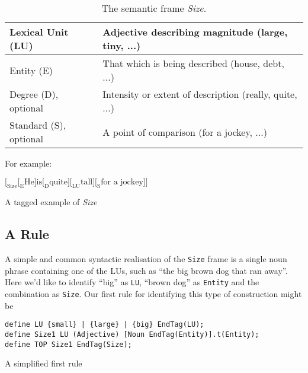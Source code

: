 \documentclass{llncs}
\begin{document}
  \begin{center}
\begin{table}[h]
  \begin{tabular}{ | l | l |}
\hline
Lexical Unit (LU) & Adjective describing magnitude (large, tiny, ...) \\
\hline
Entity (E) & That which is being described (house, debt, ...) \\
\hline
Degree (D), optional & Intensity or extent of description
(really, quite, ...) \\
\hline
Standard (S), optional & A point of comparison (for a jockey, ...) \\
\hline
    \end{tabular}
    \caption{The semantic frame \emph{Size}.}
\end{table}
      \end{center}

For example:

\begin{table}[h]
\begin{center}
\begin{math}
\Big[_{\text{Size}}\Big[_{\text{E}}\text{He} \Big]
  \text{is} \Big[_{\text{D}} \text{quite} \Big] \Big[_{\text{LU}}\text{tall} \Big]
  \Big[_{\text{S}} \text{for a jockey} \Big] \Big]
\end{math}
\end{center}
\caption{A tagged example of \emph{Size}}
\end{table}

\subsection{A Rule}

A simple and common syntactic realisation of the \verb+Size+ frame is a single
noun phrase containing one of the LUs, such as
``the big brown dog that ran away''. Here we'd like to identify ``big'' as \verb+LU+,
``brown dog'' as \verb+Entity+ and the combination as \verb+Size+.
Our first rule for identifying this type of construction might be

\begin{table}[h]
  \small
  \begin{framed}
\begin{verbatim}
define LU {small} | {large} | {big} EndTag(LU);
define Size1 LU (Adjective) [Noun EndTag(Entity)].t(Entity);
define TOP Size1 EndTag(Size);  
\end{verbatim}
\end{framed}
\normalsize
\caption{A simplified first rule}
\end{table}
\end{document}
